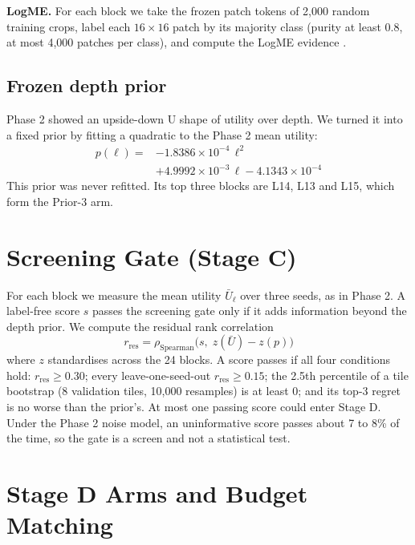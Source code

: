 \documentclass[11pt,a4paper]{report}
\begin{document}
\textbf{LogME.} For each block we take the frozen patch tokens of 2,000 random training crops, label each $16 \times 16$ patch by its majority class (purity at least 0.8, at most 4,000 patches per class), and compute the LogME evidence \cite{you2021logme}.

\subsection{Frozen depth prior}

Phase 2 showed an upside-down U shape of utility over depth. We turned it into a fixed prior by fitting a quadratic to the Phase 2 mean utility:
\begin{equation}
\begin{split}
    p(\ell) = {} & -1.8386 \times 10^{-4}\,\ell^2 \\
    & + 4.9992 \times 10^{-3}\,\ell - 4.1343 \times 10^{-4}
\end{split}
\end{equation}
This prior was never refitted. Its top three blocks are L14, L13 and L15, which form the Prior-3 arm.

\section{Screening Gate (Stage C)}

For each block we measure the mean utility $\bar U_\ell$ over three seeds, as in Phase 2. A label-free score $s$ passes the screening gate only if it adds information beyond the depth prior. We compute the residual rank correlation
\begin{equation}
    r_{\text{res}} = \rho_{\text{Spearman}}\bigl(s,\; z(\bar U) - z(p)\bigr)
\end{equation}
where $z$ standardises across the 24 blocks. A score passes if all four conditions hold: $r_{\text{res}} \geq 0.30$; every leave-one-seed-out $r_{\text{res}} \geq 0.15$; the 2.5th percentile of a tile bootstrap (8 validation tiles, 10,000 resamples) is at least 0; and its top-3 regret is no worse than the prior's. At most one passing score could enter Stage D. Under the Phase 2 noise model, an uninformative score passes about 7 to 8\% of the time, so the gate is a screen and not a statistical test.

\section{Stage D Arms and Budget Matching}
\end{document}
